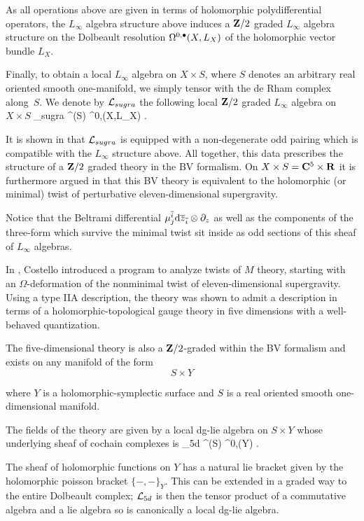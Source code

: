 As all operations above are given in terms of holomorphic polydifferential operators, the $L_\infty$ algebra structure above induces a $\mathbf{Z}/2$ graded $L_\infty$ algebra structure on the Dolbeault resolution $\Omega^{0,\bullet}(X,L_X)$ of the holomorphic vector bundle $L_X$.

Finally, to obtain a local $L_\infty$ algebra on $X \times S$, where $S$ denotes an arbitrary real oriented smooth one-manifold, we simply tensor with the de Rham complex along~$S$.
We denote by $\mathcal L_{sugra}$ the following local $\mathbf{Z}/2$ graded $L_\infty$ algebra on $X \times S$
\beqn
\cL_{sugra}  \Omega^\bu(S) \hotimes \Omega^{0,\bu}(X,L_X) .
\eeqn

\parsec[s:rsw]
It is shown in \cite{RSW} that $\mathcal L_{sugra}$ is equipped with a non-degenerate odd pairing which is compatible with the $L_\infty$ structure above. 
All together, this data prescribes the structure of a $\mathbf{Z}/2$ graded theory in the BV formalism. 
On $X \times S = \mathbf{C}^5 \times \mathbf{R}$ it is furthermore argued in \cite{RSW} that this BV theory is equivalent to the holomorphic (or minimal) twist of perturbative eleven-dimensional supergravity. 

Notice that the Beltrami differential $\mu^{\overline{i}}_j {\rm d} \overline{z}_{\overline{i}} \otimes \partial_z$ as well as the components of the three-form which survive the minimal twist sit inside as odd sections of this sheaf of $L_\infty$ algebras. 

\parsec[s:twistedsugra]

In \cite{CostelloM5,CostelloM2}, Costello introduced a program to analyze twists of $M$ theory, starting with an $\Omega$-deformation of the nonminimal twist of eleven-dimensional supergravity. Using a type IIA description, the theory was shown to admit a description in terms of a holomorphic-topological gauge theory in five dimensions with a well-behaved quantization.

The five-dimensional theory is also a $\mathbf{Z}/2$-graded within the BV formalism and exists on any manifold of the form
\[
  S\times Y
\]

where $Y$ is a holomorphic-symplectic surface and $S$ is a real oriented smooth one-dimensional manifold.

The fields of the theory are given by a local dg-lie algebra on $S\times Y$ whose underlying sheaf of cochain complexes is
\beqn
\cL_{5d}  \Omega^\bu(S) \hotimes \Omega^{0,\bu}(Y) .
\eeq

The sheaf of holomorphic functions on $Y$ has a natural lie bracket given by the holomorphic poisson bracket $\{-,-\}_{Y}$. This can be extended in a graded way to the entire Dolbeault complex; $\mathcal L_{5d}$ is then the tensor product of a commutative algebra and a lie algebra so is canonically a local dg-lie algebra.

